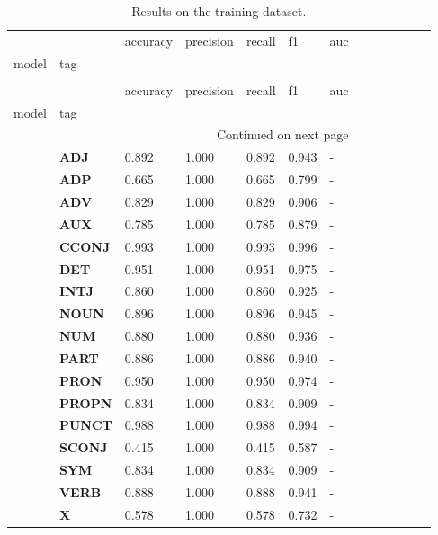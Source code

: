 \begin{longtable}{|l||l||l||l||l||l||l||l||l||l||l||l||l|}
\caption{Results on the training dataset.} \label{tab::ex_3_train} \\
\toprule
 &  & accuracy & precision & recall & f1 & auc \\
model & tag &  &  &  &  &  \\
\midrule
\endfirsthead
\caption[]{Results on the training dataset.} \\
\toprule
 &  & accuracy & precision & recall & f1 & auc \\
model & tag &  &  &  &  &  \\
\midrule
\endhead
\midrule
\multicolumn{7}{r}{Continued on next page} \\
\midrule
\endfoot
\bottomrule
\endlastfoot
\multirow[t]{18}{*}{\textbf{Baseline}} & \textbf{ADJ} & 0.892 & 1.000 & 0.892 & 0.943 & - \\
\textbf{} & \textbf{ADP} & 0.665 & 1.000 & 0.665 & 0.799 & - \\
\textbf{} & \textbf{ADV} & 0.829 & 1.000 & 0.829 & 0.906 & - \\
\textbf{} & \textbf{AUX} & 0.785 & 1.000 & 0.785 & 0.879 & - \\
\textbf{} & \textbf{CCONJ} & 0.993 & 1.000 & 0.993 & 0.996 & - \\
\textbf{} & \textbf{DET} & 0.951 & 1.000 & 0.951 & 0.975 & - \\
\textbf{} & \textbf{INTJ} & 0.860 & 1.000 & 0.860 & 0.925 & - \\
\textbf{} & \textbf{NOUN} & 0.896 & 1.000 & 0.896 & 0.945 & - \\
\textbf{} & \textbf{NUM} & 0.880 & 1.000 & 0.880 & 0.936 & - \\
\textbf{} & \textbf{PART} & 0.886 & 1.000 & 0.886 & 0.940 & - \\
\textbf{} & \textbf{PRON} & 0.950 & 1.000 & 0.950 & 0.974 & - \\
\textbf{} & \textbf{PROPN} & 0.834 & 1.000 & 0.834 & 0.909 & - \\
\textbf{} & \textbf{PUNCT} & 0.988 & 1.000 & 0.988 & 0.994 & - \\
\textbf{} & \textbf{SCONJ} & 0.415 & 1.000 & 0.415 & 0.587 & - \\
\textbf{} & \textbf{SYM} & 0.834 & 1.000 & 0.834 & 0.909 & - \\
\textbf{} & \textbf{VERB} & 0.888 & 1.000 & 0.888 & 0.941 & - \\
\textbf{} & \textbf{X} & 0.578 & 1.000 & 0.578 & 0.732 & - \\

\end{longtable}
